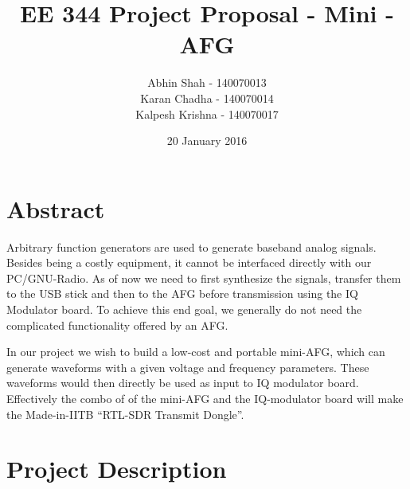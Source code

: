 \documentclass{article}
\title{EE 344 Project Proposal - Mini - AFG}
\author{
  Abhin Shah - 140070013\\
  Karan Chadha - 140070014\\
  Kalpesh Krishna - 140070017\\
}
\date{20 January 2016}
\begin{document}
\maketitle

\tableofcontents
\newpage
\section{Abstract}
Arbitrary function generators are used to generate baseband analog signals. Besides being a costly equipment, it cannot be interfaced directly with our PC/GNU-Radio. As of now we need to first synthesize the signals, transfer them to the USB stick and then to the AFG before transmission using the IQ Modulator board. To achieve this end goal, we generally do not need the complicated functionality offered by an AFG.

In our project we wish to build a low-cost and portable mini-AFG, which can generate waveforms with a given voltage and frequency parameters. These waveforms would then directly be used as input to IQ modulator board. Effectively the combo of of the mini-AFG and the IQ-modulator board will make the Made-in-IITB “RTL-SDR Transmit Dongle”.

\section{Project Description}
\end{document}
